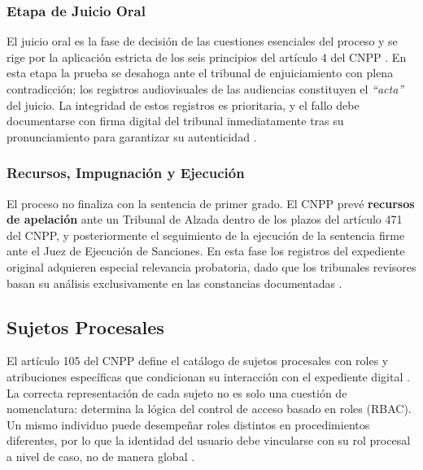 \subsubsection{Etapa de Juicio Oral}

El juicio oral es la fase de decisión de las cuestiones esenciales del proceso y se rige por la aplicación estricta de los seis principios del artículo 4 del CNPP \cite{cnpp2021}. En esta etapa la prueba se desahoga ante el tribunal de enjuiciamiento con plena contradicción; los registros audiovisuales de las audiencias constituyen el \emph{``acta''} del juicio. La integridad de estos registros es prioritaria, y el fallo debe documentarse con firma digital del tribunal inmediatamente tras su pronunciamiento para garantizar su autenticidad \cite{oaj2023ejusticia}.

\subsubsection{Recursos, Impugnación y Ejecución}

El proceso no finaliza con la sentencia de primer grado. El CNPP prevé \textbf{recursos de apelación} ante un Tribunal de Alzada dentro de los plazos del artículo 471 del CNPP, y posteriormente el seguimiento de la ejecución de la sentencia firme ante el Juez de Ejecución de Sanciones. En esta fase los registros del expediente original adquieren especial relevancia probatoria, dado que los tribunales revisores basan su análisis exclusivamente en las constancias documentadas \cite{cnpp2021}.

\subsection{Sujetos Procesales}\label{sec:sujetos-procesales}

El artículo 105 del CNPP define el catálogo de sujetos procesales con roles y atribuciones específicas que condicionan su interacción con el expediente digital \cite{cnpp2021}. La correcta representación de cada sujeto no es solo una cuestión de nomenclatura: determina la lógica del control de acceso basado en roles (RBAC). Un mismo individuo puede desempeñar roles distintos en procedimientos diferentes, por lo que la identidad del usuario debe vincularse con su rol procesal a nivel de caso, no de manera global \cite{pjguanajuato2015,gobmx2022}.

